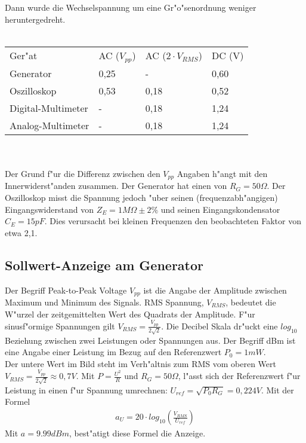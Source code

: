 \documentclass[10pt]{article}
\begin{document}
Dann wurde die Wechselspannung um eine Gr"o"senordnung weniger heruntergedreht.\\ \\
\begin{tabular}{l l l l}
Ger"at & AC ($V_{pp}$) & AC ($2 \cdot V_{RMS}$) & DC (V) \\
Generator & 0,25 & - & 0,60 \\
Oszilloskop & 0,53 & 0,18 & 0,52  \\
Digital-Multimeter & - & 0,18 & 1,24  \\
Analog-Multimeter & - & 0,18 & 1,24 \\
\end{tabular}\\\\

Der Grund f"ur die Differenz zwischen den $V_{pp}$ Angaben h"angt mit den Innerwiderst"anden zusammen. Der Generator hat einen von $R_G=50 \Omega$. Der Oszilloskop misst die Spannung jedoch "uber seinen (frequenzabh"angigen) Eingangswiderstand von $Z_E=1 M\Omega \pm 2\%$ und seinen Eingangskondensator $C_E=15 pF$. Dies verursacht bei kleinen Frequenzen den beobachteten Faktor von etwa 2,1.

\subsection{Sollwert-Anzeige am Generator}
Der Begriff Peak-to-Peak Voltage $V_{pp}$ ist die Angabe der Amplitude zwischen Maximum und Minimum des Signals. RMS Spannung, $V_{RMS}$, bedeutet die W"urzel der zeitgemittelten Wert des Quadrats der Amplitude. F"ur sinusf"ormige Spannungen gilt $V_{RMS}=\frac{V_{pp}}{2 \sqrt{2}}$. Die Decibel Skala dr"uckt eine $log_{10}$ Beziehung zwischen zwei Leistungen oder Spannungen aus. Der Begriff dBm ist eine Angabe einer Leistung im Bezug auf den Referenzwert $P_0=1mW$.\\

Der untere Wert im Bild steht im Verh"altnis zum RMS vom oberen Wert $V_{RMS}=\frac{V_{pp}}{2 \sqrt{2}} \approx 0,7V$. Mit $P=\frac{U^2}{R}$ und $R_G=50 \Omega$, l"asst sich der Referenzwert f"ur Leistung in einen f"ur Spannung umrechnen: $U_{ref}=\sqrt{P_0 R_G}=0,224 V$. Mit der Formel
\begin{eqnarray}
 a_U = 20 \cdot log_{10}(\frac{V_{RMS}}{U_{ref}})
\end{eqnarray}
Mit $a=9.99 dBm$, best"atigt diese Formel die Anzeige.\\
\end{document}
